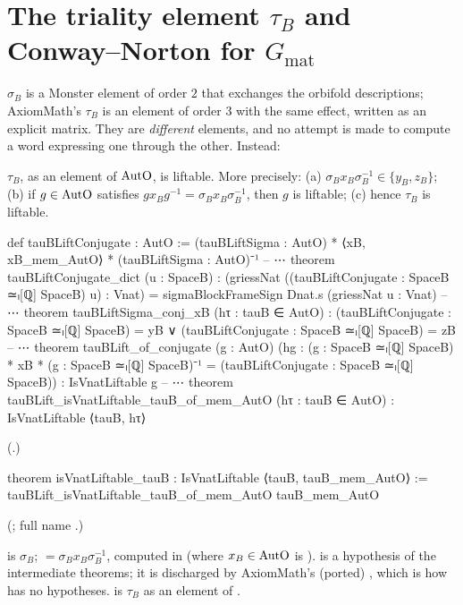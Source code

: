 \section{The triality element \texorpdfstring{$\tau_B$}{tauB} and Conway--Norton for \texorpdfstring{$G_{\mathrm{mat}}$}{Gmat}}\label{ch22:sec:tauB}

$\sigma_B$ is a Monster element of order $2$ that exchanges the orbifold descriptions; AxiomMath's $\tau_B$ is an element of
order $3$ with the same effect, written as an explicit matrix.  They are \emph{different} elements, and no attempt is made
to compute a word expressing one through the other.  Instead:

\begin{theorem}\label{ch22:thm:tauB}
$\tau_B$, as an element of $\mathrm{AutO}$, is liftable.  More precisely:
(a) $\sigma_Bx_B\sigma_B^{-1}\in\{y_B,z_B\}$;
(b) if $g\in\mathrm{AutO}$ satisfies $gx_Bg^{-1}=\sigma_Bx_B\sigma_B^{-1}$, then $g$ is liftable;
(c) hence $\tau_B$ is liftable.
\end{theorem}
\begin{leancode}
def tauBLiftConjugate : AutO :=
  (tauBLiftSigma : AutO) * ⟨xB, xB_mem_AutO⟩ * (tauBLiftSigma : AutO)⁻¹
-- ⋯
theorem tauBLiftConjugate_dict (u : SpaceB) :
    (griessNat ((tauBLiftConjugate : SpaceB ≃ₗ[ℚ] SpaceB) u) : Vnat) =
      sigmaBlockFrameSign Dnat.s (griessNat u : Vnat)
-- ⋯
theorem tauBLiftSigma_conj_xB (hτ : tauB ∈ AutO) :
    (tauBLiftConjugate : SpaceB ≃ₗ[ℚ] SpaceB) = yB ∨
      (tauBLiftConjugate : SpaceB ≃ₗ[ℚ] SpaceB) = zB
-- ⋯
theorem tauBLift_of_conjugate (g : AutO)
    (hg : (g : SpaceB ≃ₗ[ℚ] SpaceB) * xB * (g : SpaceB ≃ₗ[ℚ] SpaceB)⁻¹ =
      (tauBLiftConjugate : SpaceB ≃ₗ[ℚ] SpaceB)) : IsVnatLiftable g
-- ⋯
theorem tauBLift_isVnatLiftable_tauB_of_mem_AutO (hτ : tauB ∈ AutO) :
    IsVnatLiftable ⟨tauB, hτ⟩
\end{leancode}
(.)
\begin{leancode}
theorem isVnatLiftable_tauB : IsVnatLiftable ⟨tauB, tauB_mem_AutO⟩ :=
  tauBLift_isVnatLiftable_tauB_of_mem_AutO tauB_mem_AutO
\end{leancode}
(; full name .)
\begin{dictionary}
 is $\sigma_B$;  $=\sigma_Bx_B\sigma_B^{-1}$, computed in
 (where $x_B\in\mathrm{AutO}$ is ).   is a hypothesis of the
intermediate theorems; it is discharged by AxiomMath's (ported) , which is how
 has no hypotheses.   is $\tau_B$ as an element of
.
\end{dictionary}
